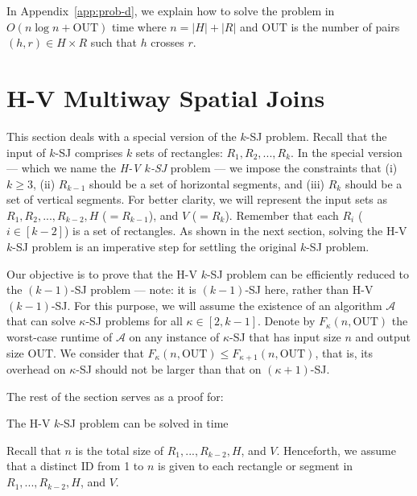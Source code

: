 \documentclass[sigconf]{acmart}
\def\vgap{\vspace{1mm}}
\def\A{\mathcal{A}}
\def\out{\mathrm{OUT}}
\begin{document}
\vgap

In Appendix~\ref{app:prob-d}, we explain how to solve the problem in $O(n \log n + \out)$ time where $n = |H| + |R|$ and $\out$ is the number of pairs $(h, r) \in H \times R$ such that $h$ crosses $r$.

\section{H-V Multiway Spatial Joins} \label{sec:hv}

This section deals with a special version of the $k$-SJ problem. Recall that the input of $k$-SJ comprises $k$ sets of rectangles: $R_1, R_2, ..., R_k$. In the special version --- which we name the {\em H-V $k$-SJ} problem ---  we impose the constraints that (i) $k \ge 3$, (ii) $R_{k-1}$ should be a set of horizontal segments, and (iii) $R_k$ should be a set of vertical segments. For better clarity, we will represent the input sets as $R_1, R_2, ..., R_{k-2}, H$ ($=R_{k-1}$), and $V$ ($=R_k$). Remember that each $R_i$ ($i \in [k-2]$) is a set of rectangles. As shown in the next section, solving the H-V $k$-SJ problem is an imperative step for settling the original $k$-SJ problem. 

\vgap 

Our objective is to prove that the H-V $k$-SJ problem can be efficiently reduced to the $(k-1)$-SJ problem --- note: it is $(k-1)$-SJ here, rather than H-V $(k-1)$-SJ. For this purpose, we will assume the existence of an algorithm $\A$ that can solve $\kappa$-SJ problems for all $\kappa \in [2, k-1]$. Denote by $F_\kappa(n, \out)$ the worst-case runtime of $\A$ on any instance of $\kappa$-SJ that has input size $n$ and output size $\out$. We consider that $F_\kappa(n, \out) \le F_{\kappa + 1}(n, \out)$, that is, its overhead on $\kappa$-SJ should not be larger than that on $(\kappa+1)$-SJ.

\vgap

The rest of the section serves as a proof for: 

\begin{lemma} \label{lmm:hv}
    The H-V $k$-SJ problem can be solved in time
    \myeqn{
        O(k) \cdot \big( F_{k-1}(n, \out) + n\log n + k \cdot \out \big). \nn 
    }
\end{lemma}

Recall that $n$ is the total size of $R_1, ..., R_{k-2}, H$, and $V$. Henceforth, we assume that a distinct ID from 1 to $n$ is given to each rectangle or segment in $R_1, ..., R_{k-2}, H$, and $V$.
\end{document}
